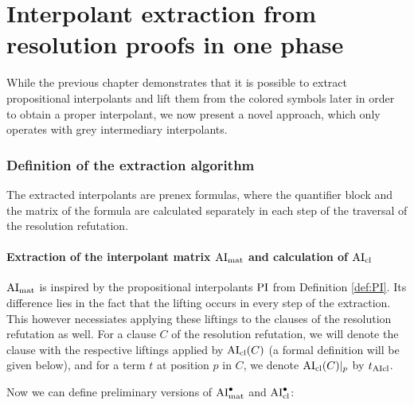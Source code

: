 \documentclass[,%
	paper=a4,%
	DIV10, 
	twoside=false,%
	liststotoc,
	bibtotoc,
	draft=false,%
	numbers=noendperiod
]{scrartcl}
\begin{document}
\part{Interpolant extraction from resolution proofs in one phase} 

While the previous chapter demonstrates that it is possible to extract propositional interpolants and lift them from the colored symbols later in order to obtain a proper interpolant, we now present a novel approach, which only operates with grey intermediary interpolants.


\section{Definition of the extraction algorithm}

The extracted interpolants are prenex formulas, where 
the quantifier block and the matrix of the formula are calculated separately in each step of the traversal of the resolution refutation.



\subsection{Extraction of the interpolant matrix $\operatorname{AI}_\mathrm{mat}$ and calculation of $\operatorname{AI}_\mathrm{cl}$}

$\operatorname{AI}_\mathrm{mat}$ is inspired by the propositional interpolants $\operatorname{PI}$ from Definition \ref{def:PI}.
Its difference lies in the fact that the lifting occurs in every step of the extraction.
This however necessiates applying these liftings to the clauses of the resolution refutation as well.
For a clause $C$ of the resolution refutation, we will denote the clause with the respective liftings applied by $\operatorname{AI}_\mathrm{cl}(C)$ (a formal definition will be given below), and for a term $t$ at position $p$ in $C$, we denote $\operatorname{AI}_\mathrm{cl}(C)|_{p}$ by $t_{\operatorname{AIcl}}$.

Now we can define preliminary versions of $\operatorname{AI}_\mathrm{mat}^\bullet$ and $\operatorname{AI}_\mathrm{cl}^\bullet$:
\end{document}
